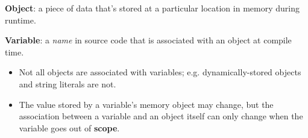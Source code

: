 \documentclass[7pt, twocolumn]{extarticle}
\begin{document}
\begin{small}
\textbf{Object}: a piece of data that's stored at a particular location in memory during runtime.

\textbf{Variable}: a \textit{name} in source code that is associated with an object at compile time.
\begin{itemize}[leftmargin=*,align=parleft]
    \setlength\itemsep{0pt}
    \item[\textcolor{info}{{\faInfoCircle}}] Not all objects are associated with variables; e.g. dynamically-stored objects and string literals are not.
    
    \item[\textcolor{error}{\faExclamationCircle}] The value stored by a variable's memory object may change, but the association between a variable and an object itself can only change when the variable goes out of \textbf{scope}.
\end{itemize} \smallskip



\end{small}
\end{document}
